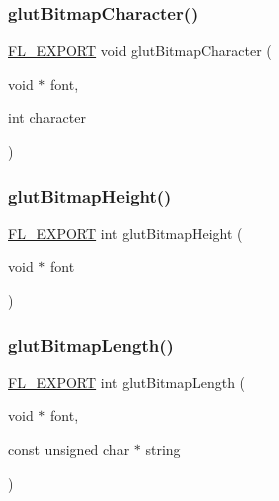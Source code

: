 \mbox{\label{glut_8_h_abf937c5ee5edd27a645b5a9d2f77c033}} 
\subsubsection{\texorpdfstring{glut\+Bitmap\+Character()}{glutBitmapCharacter()}}
{\footnotesize\ttfamily \hyperlink{_fl___export_8_h_aa9ba29a18aee9d738370a06eeb4470fc}{F\+L\+\_\+\+E\+X\+P\+O\+RT} void glut\+Bitmap\+Character (\begin{DoxyParamCaption}\item[{void $\ast$}]{font,  }\item[{int}]{character }\end{DoxyParamCaption})}

\mbox{\label{glut_8_h_a08a7ddcc94cdd5a994eb4fffaafb023e}} 
\subsubsection{\texorpdfstring{glut\+Bitmap\+Height()}{glutBitmapHeight()}}
{\footnotesize\ttfamily \hyperlink{_fl___export_8_h_aa9ba29a18aee9d738370a06eeb4470fc}{F\+L\+\_\+\+E\+X\+P\+O\+RT} int glut\+Bitmap\+Height (\begin{DoxyParamCaption}\item[{void $\ast$}]{font }\end{DoxyParamCaption})}

\mbox{\label{glut_8_h_af25720e4575a785a1354f1558088cfd2}} 
\subsubsection{\texorpdfstring{glut\+Bitmap\+Length()}{glutBitmapLength()}}
{\footnotesize\ttfamily \hyperlink{_fl___export_8_h_aa9ba29a18aee9d738370a06eeb4470fc}{F\+L\+\_\+\+E\+X\+P\+O\+RT} int glut\+Bitmap\+Length (\begin{DoxyParamCaption}\item[{void $\ast$}]{font,  }\item[{const unsigned char $\ast$}]{string }\end{DoxyParamCaption})}

